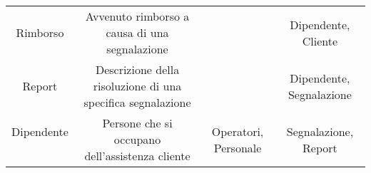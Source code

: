 \begin{center}
\begin{tabular}{ |c|c|c|c|}
\multirow{3}{6em}{Rimborso} & \multirow{3}{12em}{Avvenuto rimborso a causa di una segnalazione} & \multirow{3}{8em}{} & \multirow{3}{12em}{Dipendente, Cliente} \\
&  &  & \\
&  &  & \\ 
\hline

\multirow{3}{6em}{Report} & \multirow{3}{12em}{Descrizione della risoluzione di una specifica segnalazione} & \multirow{3}{8em}{} & \multirow{3}{12em}{Dipendente, Segnalazione} \\
&  &  & \\
&  &  & \\ 
\hline

\multirow{0}{6em}{Dipendente} & \multirow{3}{12em}{Persone che si occupano dell'assistenza cliente} & \multirow{3}{8em}{Operatori, Personale} & \multirow{3}{12em}{Segnalazione, Report} \\
&  &  & \\
&  &  & \\ 
\hline

\end{tabular}
\end{center}